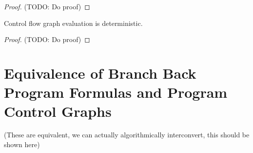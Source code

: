 \documentclass[11pt]{article}
\begin{document}
\begin{proof}
(TODO: Do proof)
\end{proof}

\newtheorem*{evalcfgdeterminism}{Theorem}
\begin{evaldeterminism}
Control flow graph evaluation is deterministic.
\end{evaldeterminism}

\begin{proof}
(TODO: Do proof)
\end{proof}

\begin{comment}
\newtheorem*{evalcfgnotnormalizing}{Theorem}
\begin{evalnotnormalizing}
Evaluation is not generally normalizing.
\end{evalnotnormalizing}

\begin{proof}
(TODO: Do proof)
\end{proof}
\end{comment}

\section{Equivalence of Branch Back Program Formulas and Program Control Graphs}

(These are equivalent, we can actually algorithmically interconvert, this should be shown here)
\end{document}
